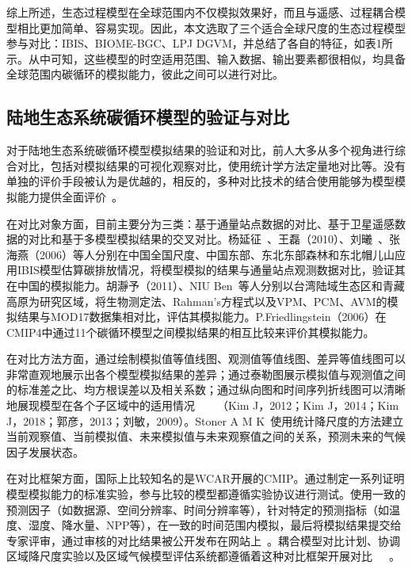 综上所述，生态过程模型在全球范围内不仅模拟效果好，而且与遥感、过程耦合模型相比更加简单、容易实现。因此，本文选取了三个适合全球尺度的生态过程模型参与对比：IBIS、BIOME-BGC、LPJ DGVM，并总结了各自的特征，如表1所示。从中可知，这些模型的时空适用范围、输入数据、输出要素都很相似，均具备全球范围内碳循环的模拟能力，彼此之间可以进行对比。


\subsection{陆地生态系统碳循环模型的验证与对比}

对于陆地生态系统碳循环模型模拟结果的验证和对比，前人大多从多个视角进行综合对比，包括对模拟结果的可视化观察对比，使用统计学方法定量地对比等。没有单独的评价手段被认为是优越的，相反的，多种对比技术的结合使用能够为模型模拟能力提供全面评价~\cite{Taylor2012An}。

在对比对象方面，目前主要分为三类：基于通量站点数据的对比、基于卫星遥感数据的对比和基于多模型模拟结果的交叉对比。杨延征~\cite{杨延征2016基于}、王磊（2010）、刘曦~\cite{刘曦2011IBIS}、张海燕（2006）等人分别在中国全国尺度、中国东部、东北东部森林和东北帽儿山应用IBIS模型估算碳排放情况，将模型模拟的结果与通量站点观测数据对比，验证其在中国的模拟能力。胡瀞予（2011）、NIU Ben~\cite{Niu2017Satellite}等人分别以台湾陆域生态区和青藏高原为研究区域，将生物测定法、Rahman’s方程式以及VPM、PCM、AVM的模拟结果与MOD17数据集相对比，评估其模拟能力。P.Friedlingstein（2006）在CMIP4中通过11个碳循环模型之间模拟结果的相互比较来评价其模拟能力。

在对比方法方面，通过绘制模拟值等值线图、观测值等值线图、差异等值线图可以非常直观地展示出各个模型模拟结果的差异；通过泰勒图展示模拟值与观测值之间的标准差之比、均方根误差以及相关系数；通过纵向图和时间序列折线图可以清晰地展现模型在各个子区域中的适用情况~\cite{Kim2013Evaluation}~\cite{Kim2014Evaluation}~\cite{Kim2017Winter}~\cite{刘敏200913}（Kim J，2012；Kim J，2014；Kim J，2018；郭彦，2013；刘敏，2009）。Stoner A M K~\cite{Stoner2013An}使用统计降尺度的方法建立当前观察值、当前模拟值、未来模拟值与未来观察值之间的关系，预测未来的气候因子发展状态。

在对比框架方面，国际上比较知名的是WCAR开展的CMIP。通过制定一系列证明模型模拟能力的标准实验，参与比较的模型都遵循实验协议进行测试。使用一致的预测因子（如数据源、空间分辨率、时间分辨率等），针对特定的预测指标（如温度、湿度、降水量、NPP等），在一致的时间范围内模拟，最后将模拟结果提交给专家评审，通过审核的对比结果被公开发布在网站上~\cite{Taylor2012An}。耦合模型对比计划、协调区域降尺度实验以及区域气候模型评估系统都遵循着这种对比框架开展对比~\cite{eyring2016overview}~\cite{Gutowski2009The}~\cite{赵宗慈2016CMIP6}。


